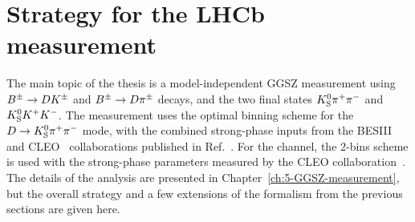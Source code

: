 





\section{Strategy for the LHCb measurement} %
\label{sec:strategy_for_lhcb_measurement}

The main topic of the thesis is a model-independent GGSZ measurement using ${{{B}^\pm}\rightarrow{\ensuremath{D}}{\ensuremath{{K}^\pm}}}$ and ${{{B}^\pm}\rightarrow{\ensuremath{D}}{\ensuremath{{\pi}^\pm}}}$ decays, and the two \D final states ${{K}^0_{\mathrm{S}}}{{\pi}^+}{{\pi}^-}$ and ${{K}^0_{\mathrm{S}}}{{K}^+}{{K}^-}$. The measurement uses the optimal binning scheme for the ${D\rightarrow{\ensuremath{{K}^0_{\mathrm{S}}}}{\ensuremath{{\pi}^+}}{\ensuremath{{\pi}^-}}}$ mode, with the combined strong-phase inputs from the BESIII~\cite{BESCISI} and CLEO~\cite{CLEOCISI} collaborations published in Ref.~\cite{BESCISI}. For the \DtoKsKK channel, the 2-bins scheme is used with the strong-phase parameters measured by the CLEO collaboration~\cite{CLEOCISI}. The details of the analysis are presented in Chapter~\eqref{ch:5-GGSZ-measurement}, but the overall strategy and a few extensions of the formalism from the previous sections are given here.

